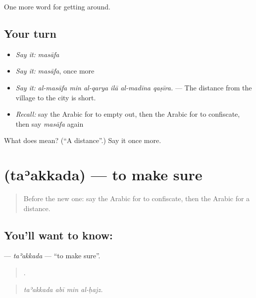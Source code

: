 \begin{grammarlens}[title={What you've built}]
One more word for getting around.
\end{grammarlens}

\subsection*{Your turn}
\begin{itemize}
\raggedright
  \item \emph{Say it:} \emph{masāfa}
  \item \emph{Say it:} \emph{masāfa}, once more
  \item \emph{Say it:} \emph{al-masāfa min al-qarya ilā al-madīna qaṣīra.} — The distance from the village to the city is short.
  \item \emph{Recall:} say the Arabic for to empty out, then the Arabic for to confiscate, then say \emph{masāfa} again
\end{itemize}

\begin{tcolorbox}[breakable,colback=teal!4,colframe=teal!35!black,title={Before you move on}]
What does  mean? (\textquotedblleft{}A distance\textquotedblright{}.) Say it once more.
\end{tcolorbox}
\section[\texorpdfstring{\ar{تأكد} (taʾakkada)}{تأكد (taʾakkada)}]{ (taʾakkada) — to make sure}

\label{lesson:AR-C427-taakkada}



\begin{quote}
Before the new one: say the Arabic for to confiscate, then the Arabic for a distance.
\end{quote}

\subsection*{You'll want to know: }
\textbf{} — \emph{taʾakkada} — \textquotedblleft{}to make sure\textquotedblright{}.

\begin{quote}
   .
\end{quote}

\begin{quote}
\emph{taʾakkada abī min al-ḥajz.}
\end{quote}

